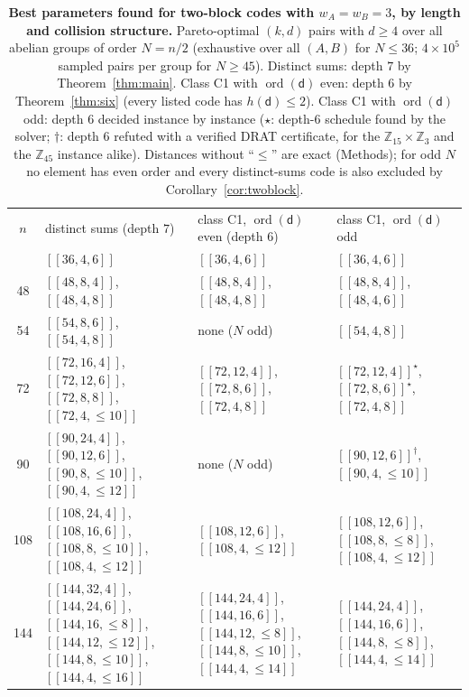 \documentclass[reprint,twocolumn,superscriptaddress,nofootinbib]{revtex4-2}
\theoremstyle{plain}
\newcommand{\col}{\mathsf{d}}          %
\newcommand{\wA}{w_A}                  %
\newcommand{\wB}{w_B}
\begin{document}
\begin{table}[t]
\caption{\textbf{Best parameters found for two-block codes with
$\wA=\wB=3$, by length and collision structure.} Pareto-optimal $(k,d)$
pairs with $d\ge4$ over all abelian groups of order $N=n/2$ (exhaustive
over all $(A,B)$ for $N\le36$; $4\times10^5$ sampled pairs per group for
$N\ge45$). Distinct sums: depth $7$ by Theorem~\ref{thm:main}. Class C1
with $\operatorname{ord}(\col)$ even: depth $6$ by Theorem~\ref{thm:six}
(every listed code has $h(\col)\le2$). Class C1 with
$\operatorname{ord}(\col)$ odd: depth $6$ decided instance by instance
($\star$: depth-$6$ schedule found by the solver; $\dagger$: depth $6$
refuted with a verified DRAT certificate, for the
$\mathbb{Z}_{15}\times\mathbb{Z}_3$ and the $\mathbb{Z}_{45}$ instance
alike). Distances
without ``$\le$'' are exact (Methods); for odd $N$ no element has even
order and every distinct-sums code is also excluded by
Corollary~\ref{cor:twoblock}.}
\label{tab:depth6codes}
\begin{ruledtabular}
\begin{tabular}{cp{}p{}p{}}
$n$ & distinct sums (depth $7$) & class C1, $\operatorname{ord}(\col)$ even (depth $6$) & class C1, $\operatorname{ord}(\col)$ odd \\
\colrule
36  & $[[36,4,6]]$ & $[[36,4,6]]$ & $[[36,4,6]]$ \\
48  & $[[48,8,4]]$, $[[48,4,8]]$ & $[[48,8,4]]$, $[[48,4,8]]$ & $[[48,8,4]]$, $[[48,4,6]]$ \\
54  & $[[54,8,6]]$, $[[54,4,8]]$ & none ($N$ odd) & $[[54,4,8]]$ \\
72  & $[[72,16,4]]$, $[[72,12,6]]$, $[[72,8,8]]$, $[[72,4,\le10]]$ & $[[72,12,4]]$, $[[72,8,6]]$, $[[72,4,8]]$ & $[[72,12,4]]^\star$, $[[72,8,6]]^\star$, $[[72,4,8]]$ \\
90  & $[[90,24,4]]$, $[[90,12,6]]$, $[[90,8,\le10]]$, $[[90,4,\le12]]$ & none ($N$ odd) & $[[90,12,6]]^\dagger$, $[[90,4,\le10]]$ \\
108 & $[[108,24,4]]$, $[[108,16,6]]$, $[[108,8,\le10]]$, $[[108,4,\le12]]$ & $[[108,12,6]]$, $[[108,4,\le12]]$ & $[[108,12,6]]$, $[[108,8,\le8]]$, $[[108,4,\le12]]$ \\
144 & $[[144,32,4]]$, $[[144,24,6]]$, $[[144,16,\le8]]$, $[[144,12,\le12]]$, $[[144,8,\le10]]$, $[[144,4,\le16]]$ & $[[144,24,4]]$, $[[144,16,6]]$, $[[144,12,\le8]]$, $[[144,8,\le10]]$, $[[144,4,\le14]]$ & $[[144,24,4]]$, $[[144,16,6]]$, $[[144,8,\le8]]$, $[[144,4,\le14]]$ \\
\end{tabular}
\end{ruledtabular}
\end{table}
\end{document}

